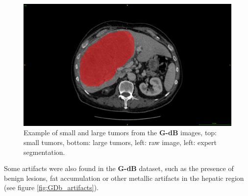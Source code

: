 \documentclass[]{article}
\newcommand{\lmttfont}[1]{{\fontfamily{lmtt}\selectfont #1}}
\begin{document}
\begin{figure}[!ht]
\begin{minipage}{0.45\linewidth}
	\end{minipage} \hspace{-0.1cm}
	\begin{minipage}{0.45\linewidth}
		\includegraphics[width=\linewidth]{../Contributions/images/ResizeGDB_examplePatientLargeTumor_seg}
	\end{minipage}
	\caption{Example of small and large tumors from the \textbf{\lmttfont{G-dB}} images, top: small tumors, bottom: large tumors, left: raw image, left: expert segmentation.}
	\label{fig:interdb_tumorSeg_tumorExamples}
\end{figure}
Some artifacts were also found in the \textbf{\lmttfont{G-dB}} dataset, such as the presence of benign lesions, fat accumulation or other metallic artifacts in the hepatic region (see figure \ref{fig:GDb_artifacts}).
\end{document}
